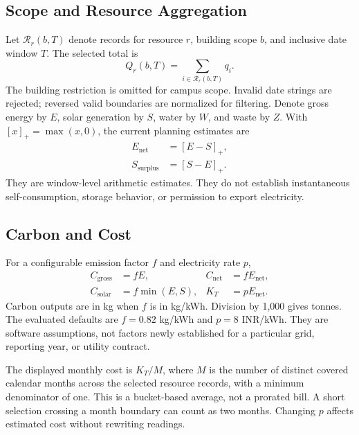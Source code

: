 \documentclass[conference]{IEEEtran}
\newcommand{\pos}[1]{\left[#1\right]_{+}}
\begin{document}
\subsection{Scope and Resource Aggregation}
Let $\mathcal{R}_r(b,T)$ denote records for resource $r$, building scope $b$, and inclusive date window $T$. The selected total is
\begin{equation}
Q_r(b,T)=\sum_{i\in\mathcal{R}_r(b,T)}q_i.
\end{equation}
The building restriction is omitted for campus scope. Invalid date strings are rejected; reversed valid boundaries are normalized for filtering. Denote gross energy by $E$, solar generation by $S$, water by $W$, and waste by $Z$. With $\pos{x}=\max(x,0)$, the current planning estimates are
\begin{align}
E_{\mathrm{net}}&=\pos{E-S},\\
S_{\mathrm{surplus}}&=\pos{S-E}.
\end{align}
They are window-level arithmetic estimates. They do not establish instantaneous self-consumption, storage behavior, or permission to export electricity.

\subsection{Carbon and Cost}
For a configurable emission factor $f$ and electricity rate $p$,
\begin{align}
C_{\mathrm{gross}}&=fE, & C_{\mathrm{net}}&=fE_{\mathrm{net}},\\
C_{\mathrm{solar}}&=f\min(E,S), & K_T&=pE_{\mathrm{net}}.
\end{align}
Carbon outputs are in kg when $f$ is in kg/kWh. Division by 1,000 gives tonnes. The evaluated defaults are $f=0.82$ kg/kWh and $p=8$ INR/kWh. They are software assumptions, not factors newly established for a particular grid, reporting year, or utility contract.

The displayed monthly cost is $K_T/M$, where $M$ is the number of distinct covered calendar months across the selected resource records, with a minimum denominator of one. This is a bucket-based average, not a prorated bill. A short selection crossing a month boundary can count as two months. Changing $p$ affects estimated cost without rewriting readings.
\end{document}
